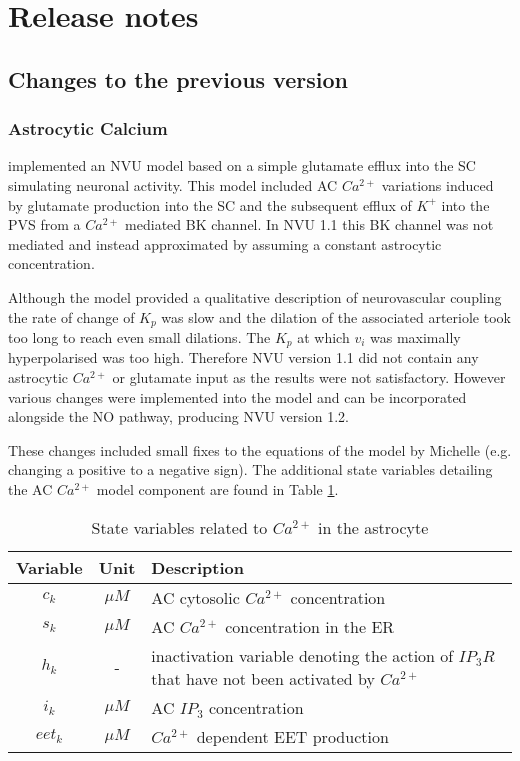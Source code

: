 \section{Release notes}


\subsection{Changes to the previous version}

	\subsubsection{Astrocytic Calcium}
	
	\citet{Farr2011} implemented an NVU model based on a simple glutamate efflux into the SC simulating neuronal activity. This model included AC $Ca^{2+}$ variations induced by glutamate production into the SC and the subsequent efflux of $K^+$ into the PVS from a $Ca^{2+}$ mediated BK channel. In NVU 1.1 this BK channel was not \ca mediated and instead approximated by assuming a constant astrocytic \ca concentration.
			
	Although the model provided a qualitative description of neurovascular coupling the rate of change of $K_p$ was slow and the dilation of the associated arteriole took too long to reach even small dilations. The $K_p$ at which $v_i$ was maximally hyperpolarised was too high. 
	Therefore NVU version 1.1 did not contain any astrocytic $Ca^{2+}$ or glutamate input as the results were not satisfactory. 
	However various changes were implemented into the model and can be incorporated alongside the NO pathway, producing NVU version 1.2. 
	
	These changes included small fixes to the equations of the model by Michelle (e.g. changing a positive to a negative sign). 
	The additional state variables detailing the AC $Ca^{2+}$ model component are found in Table \ref{tab:NVU12ac}.
	
			\begin{table}[h!]
				\small
				\centering
					\begin{tabular}{c c l}
				\hline
				Variable & Unit & Description \\
				\hline
				$c_k$ & $\mu M$ & AC cytosolic $Ca^{2+}$ concentration \\
				$s_k$ & $\mu M$ & AC $Ca^{2+}$ concentration in the ER \\
				$h_k$ & - & inactivation variable denoting the action of $IP_3R$ that have not been activated by $Ca^{2+}$ \\
				$i_k$ & $\mu M$ & AC $IP_3$ concentration \\
				$eet_k$ &  $\mu M$ & $Ca^{2+}$ dependent EET production \\
				\hline
					\end{tabular}
					\caption{State variables related to $Ca^{2+}$ in the astrocyte}
					\label{tab:NVU12ac}
			\end{table}
			
